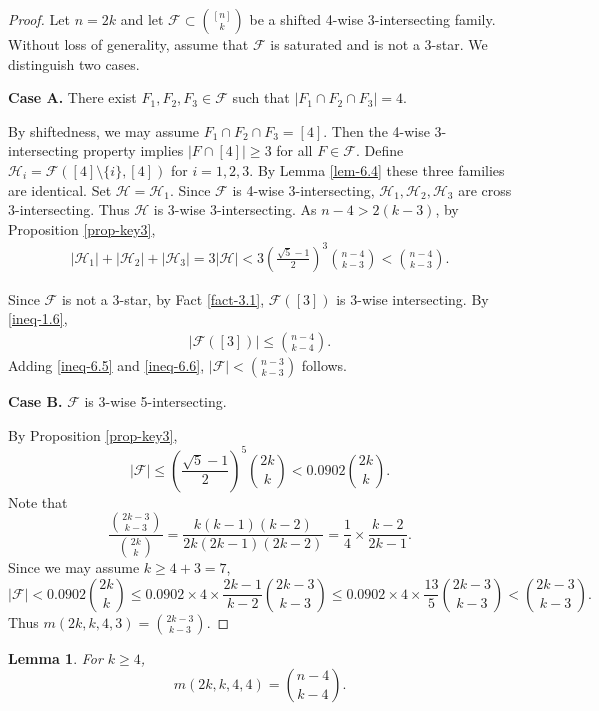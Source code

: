 \documentclass[11pt,a4paper]{article}
\newtheorem{lem}[thm]{Lemma}
\newtheorem{false statement}{False statement}
\theoremstyle{definition}
\def\hh{\mathcal{H}}
\def\hf{\mathcal{F}}
\begin{document}
\begin{proof}
Let $n=2k$ and let $\hf\subset \binom{[n]}{k}$ be a shifted 4-wise 3-intersecting family. Without loss of generality, assume that $\hf$ is saturated and is not a 3-star. We distinguish two cases.

\vspace{3pt}
{\noindent\bf Case A.} There exist $F_1,F_2,F_3\in \hf$ such that $|F_1\cap F_2\cap F_3|=4$.
\vspace{3pt}

By shiftedness, we may assume $F_1\cap F_2\cap F_3=[4]$. Then the 4-wise 3-intersecting property implies $|F\cap [4]|\geq 3$ for all  $F\in \hf$. Define $\hh_i=\hf([4]\setminus \{i\}, [4])$ for $i=1,2,3$. By Lemma \ref{lem-6.4} these three families are identical. Set $\hh=\hh_1$. Since $\hf$ is 4-wise 3-intersecting, $\hh_1,\hh_2,\hh_3$  are cross 3-intersecting. Thus $\hh$ is 3-wise 3-intersecting. As $n-4>2(k-3)$, by Proposition \ref{prop-key3},
\begin{align}\label{ineq-6.5}
|\hh_1|+|\hh_2|+|\hh_3| =3|\hh| <3\left(\frac{\sqrt{5}-1}{2}\right)^3\binom{n-4}{k-3}<\binom{n-4}{k-3}.
\end{align}

Since $\hf$ is not a 3-star, by Fact \ref{fact-3.1}, $\hf([3])$ is 3-wise intersecting. By \eqref{ineq-1.6},
\begin{align}\label{ineq-6.6}
|\hf([3])| \leq \binom{n-4}{k-4}.
\end{align}
Adding \eqref{ineq-6.5} and \eqref{ineq-6.6}, $|\hf|<\binom{n-3}{k-3}$ follows.

\vspace{3pt}
{\noindent\bf Case B.} $\hf$ is 3-wise 5-intersecting.
\vspace{3pt}

By Proposition \ref{prop-key3},
\[
|\hf| \leq \left(\frac{\sqrt{5} -1}{2}\right)^5 \binom{2k}{k} <0.0902\binom{2k}{k}.
\]
Note that
\[
\frac{\binom{2k-3}{k-3}}{\binom{2k}{k}} =\frac{k(k-1)(k-2)}{2k(2k-1)(2k-2)} =\frac{1}{4} \times \frac{k-2}{2k-1}.
\]
Since we may assume $k\geq  4+3=7$,
\[
|\hf|<0.0902\binom{2k}{k} \leq 0.0902 \times 4 \times \frac{2k-1}{k-2}\binom{2k-3}{k-3} \leq 0.0902 \times 4 \times \frac{13}{5}\binom{2k-3}{k-3}<\binom{2k-3}{k-3}.
\]
Thus $m(2k,k,4,3)=\binom{2k-3}{k-3}$.
\end{proof}

\begin{lem}\label{lem-6.6}
For $k\geq 4$,
\[
m(2k,k,4,4)=\binom{n-4}{k-4}.
\]
\end{lem}
\end{document}
